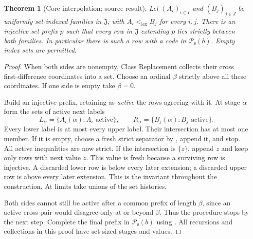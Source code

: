 \documentclass[11pt]{article}
\newtheorem{theorem}{Theorem}[section]
\theoremstyle{definition}
\theoremstyle{remark}
\newcommand{\Jinj}{\mathfrak J}
\newcommand{\Psupp}{\mathcal P_{\mathrm{s}}}
\newcommand{\lex}{\mathrm{lex}}
\begin{document}
\begin{theorem}[Core interpolation; source result]\label{swo:gs:thm:core-interpolation}
Let $(A_i)_{i\in I}$ and $(B_j)_{j\in J}$ be uniformly set-indexed
families in $\Jinj$, with $A_i<_{\lex}B_j$ for every $i,j$. There is an
injective set prefix $p$ such that every row in $\Jinj$ extending $p$ lies
strictly between both families. In particular there is such a row with
a code in $\Psupp(b)$. Empty index sets are permitted.
\end{theorem}
\begin{proof}
When both sides are nonempty, Class Replacement collects their cross
first-difference coordinates into a set. Choose an ordinal $\beta$
strictly above all these coordinates. If one side is empty take
$\beta=0$.

Build an injective prefix, retaining as \emph{active} the rows agreeing
with it. At stage $\alpha$ form the sets of active next labels
\[
 L_\alpha=\{A_i(\alpha):A_i\text{ active}\},\qquad
 R_\alpha=\{B_j(\alpha):B_j\text{ active}\}.
\]
Every lower label is at most every upper label. Their intersection has
at most one member. If it is empty, choose a fresh strict separator by
, append it, and stop. All active inequalities
are now strict. If the intersection is $\{z\}$, append $z$ and keep only
rows with next value $z$. This value is fresh because a surviving row is
injective. A discarded lower row is below every later extension; a
discarded upper row is above every later extension. This is the invariant
throughout the construction. At limits take unions of the set histories.

Both sides cannot still be active after a common prefix of length
$\beta$, since an active cross pair would disagree only at or beyond
$\beta$. Thus the procedure stops by the next step. Complete the final
prefix in $\Psupp(b)$ using . All recursions
and collections in this proof have set-sized stages and values.
\end{proof}
\end{document}
